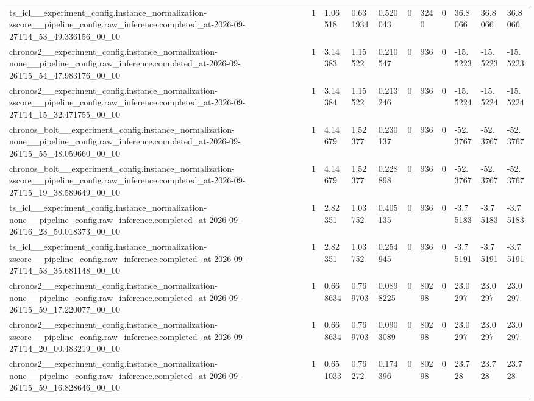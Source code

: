 \begin{tabular}{lllllllllll}
ts\_icl\_\_experiment\_config.instance\_normalization-zscore\_\_pipeline\_config.raw\_inference.completed\_at-2026-09-27T14\_53\_49.336156\_00\_00 & 1 & 1.06518 & 0.631934 & 0.520043 & 0 & 3240 & 0 & 36.8066 & 36.8066 & 36.8066 \\
chronos2\_\_experiment\_config.instance\_normalization-none\_\_pipeline\_config.raw\_inference.completed\_at-2026-09-26T15\_54\_47.983176\_00\_00 & 1 & 3.14383 & 1.15522 & 0.210547 & 0 & 936 & 0 & -15.5223 & -15.5223 & -15.5223 \\
chronos2\_\_experiment\_config.instance\_normalization-zscore\_\_pipeline\_config.raw\_inference.completed\_at-2026-09-27T14\_15\_32.471755\_00\_00 & 1 & 3.14384 & 1.15522 & 0.213246 & 0 & 936 & 0 & -15.5224 & -15.5224 & -15.5224 \\
chronos\_bolt\_\_experiment\_config.instance\_normalization-none\_\_pipeline\_config.raw\_inference.completed\_at-2026-09-26T15\_55\_48.059660\_00\_00 & 1 & 4.14679 & 1.52377 & 0.230137 & 0 & 936 & 0 & -52.3767 & -52.3767 & -52.3767 \\
chronos\_bolt\_\_experiment\_config.instance\_normalization-zscore\_\_pipeline\_config.raw\_inference.completed\_at-2026-09-27T15\_19\_38.589649\_00\_00 & 1 & 4.14679 & 1.52377 & 0.228898 & 0 & 936 & 0 & -52.3767 & -52.3767 & -52.3767 \\
ts\_icl\_\_experiment\_config.instance\_normalization-none\_\_pipeline\_config.raw\_inference.completed\_at-2026-09-26T16\_23\_50.018373\_00\_00 & 1 & 2.82351 & 1.03752 & 0.405135 & 0 & 936 & 0 & -3.75183 & -3.75183 & -3.75183 \\
ts\_icl\_\_experiment\_config.instance\_normalization-zscore\_\_pipeline\_config.raw\_inference.completed\_at-2026-09-27T14\_53\_35.681148\_00\_00 & 1 & 2.82351 & 1.03752 & 0.254945 & 0 & 936 & 0 & -3.75191 & -3.75191 & -3.75191 \\
chronos2\_\_experiment\_config.instance\_normalization-none\_\_pipeline\_config.raw\_inference.completed\_at-2026-09-26T15\_59\_17.220077\_00\_00 & 1 & 0.668634 & 0.769703 & 0.0898225 & 0 & 80298 & 0 & 23.0297 & 23.0297 & 23.0297 \\
chronos2\_\_experiment\_config.instance\_normalization-zscore\_\_pipeline\_config.raw\_inference.completed\_at-2026-09-27T14\_20\_00.483219\_00\_00 & 1 & 0.668634 & 0.769703 & 0.0903089 & 0 & 80298 & 0 & 23.0297 & 23.0297 & 23.0297 \\
chronos2\_\_experiment\_config.instance\_normalization-none\_\_pipeline\_config.raw\_inference.completed\_at-2026-09-26T15\_59\_16.828646\_00\_00 & 1 & 0.651033 & 0.76272 & 0.174396 & 0 & 80298 & 0 & 23.728 & 23.728 & 23.728 \\

\end{tabular}
